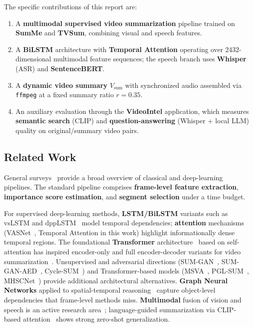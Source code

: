 \documentclass[10pt,conference]{IEEEtran}
\begin{document}
The specific contributions of this report are:
\begin{enumerate}
  \item A \textbf{multimodal supervised video summarization} pipeline trained
        on \textbf{SumMe} and \textbf{TVSum}, combining visual and speech
        features.
  \item A \textbf{BiLSTM} architecture with \textbf{Temporal Attention}
        operating over 2432-dimensional multimodal feature sequences; the
        speech branch uses \textbf{Whisper} (ASR) and \textbf{SentenceBERT}.
  \item A \textbf{dynamic video summary} $V_{\mathrm{sum}}$ with synchronized
        audio assembled via \texttt{ffmpeg} at a fixed summary ratio
        $r = 0.35$.
  \item An auxiliary evaluation through the \textbf{VideoIntel} application,
        which measures \textbf{semantic search} (CLIP) and
        \textbf{question-answering} (Whisper + local LLM) quality on
        original/summary video pairs.
\end{enumerate}

\subsection{Related Work}

General surveys~\cite{haq2021,money2015,apostolidis2021survey,hu2023,kadam2022}
provide a broad overview of classical and deep-learning pipelines. The standard
pipeline comprises \textbf{frame-level feature extraction}, \textbf{importance
score estimation}, and \textbf{segment selection} under a time budget.

For supervised deep-learning methods, \textbf{LSTM/BiLSTM} variants such as
vsLSTM and dppLSTM~\cite{zhang2016lstm} model temporal dependencies;
\textbf{attention} mechanisms (VASNet~\cite{fajtl2018}, Temporal Attention in
this work) highlight informationally dense temporal regions. The foundational
\textbf{Transformer} architecture~\cite{vaswani2017} based on self-attention
has inspired encoder-only and full encoder-decoder variants for video
summarization~\cite{lan2025fulltransnet,ji2019avs}. Unsupervised and
adversarial directions (SUM-GAN~\cite{mahasseni2017},
SUM-GAN-AED~\cite{apostolidis2023sumganaed}, Cycle-SUM~\cite{zhang2019})
and Transformer-based models (MSVA~\cite{ghauri2021}, PGL-SUM~\cite{apostolidis2021pgl},
MHSCNet~\cite{zhu2022}) provide additional architectural alternatives.
\textbf{Graph Neural Networks} applied to spatial-temporal
reasoning~\cite{zhu2022rrstg} capture object-level dependencies that
frame-level methods miss. \textbf{Multimodal} fusion of vision and speech
is an active research area~\cite{psallidas2021,he2023align}; language-guided
summarization via CLIP-based attention~\cite{narasimhan2021clipit} shows
strong zero-shot generalization.
\end{document}

